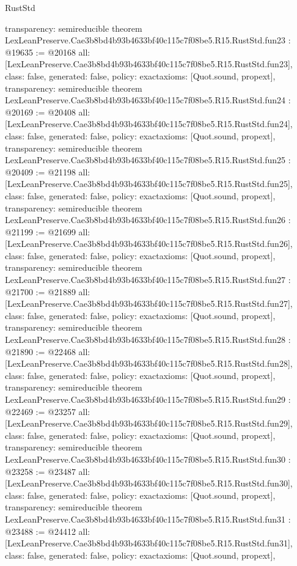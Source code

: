 \begin{lexlean}{RustStd}
\begin{coremodule}
{  transparency: semireducible
}
theorem LexLeanPreserve.Cae3b8bd4b93b4633bf40c115c7f08be5.R15.RustStd.fun23 : @19635 := @20168 {
  all: [LexLeanPreserve.Cae3b8bd4b93b4633bf40c115c7f08be5.R15.RustStd.fun23],
  class: false,
  generated: false,
  policy: exact{axioms: [Quot.sound, propext]},
  transparency: semireducible
}
theorem LexLeanPreserve.Cae3b8bd4b93b4633bf40c115c7f08be5.R15.RustStd.fun24 : @20169 := @20408 {
  all: [LexLeanPreserve.Cae3b8bd4b93b4633bf40c115c7f08be5.R15.RustStd.fun24],
  class: false,
  generated: false,
  policy: exact{axioms: [Quot.sound, propext]},
  transparency: semireducible
}
theorem LexLeanPreserve.Cae3b8bd4b93b4633bf40c115c7f08be5.R15.RustStd.fun25 : @20409 := @21198 {
  all: [LexLeanPreserve.Cae3b8bd4b93b4633bf40c115c7f08be5.R15.RustStd.fun25],
  class: false,
  generated: false,
  policy: exact{axioms: [Quot.sound, propext]},
  transparency: semireducible
}
theorem LexLeanPreserve.Cae3b8bd4b93b4633bf40c115c7f08be5.R15.RustStd.fun26 : @21199 := @21699 {
  all: [LexLeanPreserve.Cae3b8bd4b93b4633bf40c115c7f08be5.R15.RustStd.fun26],
  class: false,
  generated: false,
  policy: exact{axioms: [Quot.sound, propext]},
  transparency: semireducible
}
theorem LexLeanPreserve.Cae3b8bd4b93b4633bf40c115c7f08be5.R15.RustStd.fun27 : @21700 := @21889 {
  all: [LexLeanPreserve.Cae3b8bd4b93b4633bf40c115c7f08be5.R15.RustStd.fun27],
  class: false,
  generated: false,
  policy: exact{axioms: [Quot.sound, propext]},
  transparency: semireducible
}
theorem LexLeanPreserve.Cae3b8bd4b93b4633bf40c115c7f08be5.R15.RustStd.fun28 : @21890 := @22468 {
  all: [LexLeanPreserve.Cae3b8bd4b93b4633bf40c115c7f08be5.R15.RustStd.fun28],
  class: false,
  generated: false,
  policy: exact{axioms: [Quot.sound, propext]},
  transparency: semireducible
}
theorem LexLeanPreserve.Cae3b8bd4b93b4633bf40c115c7f08be5.R15.RustStd.fun29 : @22469 := @23257 {
  all: [LexLeanPreserve.Cae3b8bd4b93b4633bf40c115c7f08be5.R15.RustStd.fun29],
  class: false,
  generated: false,
  policy: exact{axioms: [Quot.sound, propext]},
  transparency: semireducible
}
theorem LexLeanPreserve.Cae3b8bd4b93b4633bf40c115c7f08be5.R15.RustStd.fun30 : @23258 := @23487 {
  all: [LexLeanPreserve.Cae3b8bd4b93b4633bf40c115c7f08be5.R15.RustStd.fun30],
  class: false,
  generated: false,
  policy: exact{axioms: [Quot.sound, propext]},
  transparency: semireducible
}
theorem LexLeanPreserve.Cae3b8bd4b93b4633bf40c115c7f08be5.R15.RustStd.fun31 : @23488 := @24412 {
  all: [LexLeanPreserve.Cae3b8bd4b93b4633bf40c115c7f08be5.R15.RustStd.fun31],
  class: false,
  generated: false,
  policy: exact{axioms: [Quot.sound, propext]},
}
\end{coremodule}
\end{lexlean}
